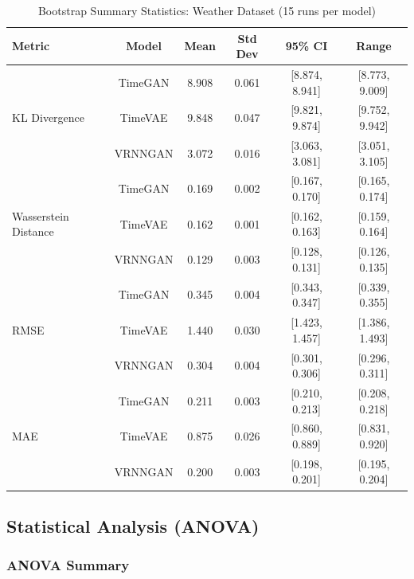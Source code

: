 \documentclass{article}
\begin{document}
\begin{table}[H]
    \centering
    \caption{Bootstrap Summary Statistics: Weather Dataset (15 runs per model)}
    \label{tab:bootstrap_weather}
    \small
    \begin{tabular}{lccccc}
        \toprule
        \textbf{Metric} & \textbf{Model} & \textbf{Mean} & \textbf{Std Dev} & \textbf{95\% CI} & \textbf{Range} \\
        \midrule
        \multirow{3}{*}{KL Divergence} 
    & TimeGAN   & 8.908 & 0.061 & [8.874, 8.941] & [8.773, 9.009] \\
    & TimeVAE   & 9.848 & 0.047 & [9.821, 9.874] & [9.752, 9.942] \\
    & VRNNGAN   & 3.072 & 0.016 & [3.063, 3.081] & [3.051, 3.105] \\
    \midrule
    \multirow{3}{*}{Wasserstein Distance} 
    & TimeGAN   & 0.169 & 0.002 & [0.167, 0.170] & [0.165, 0.174] \\
    & TimeVAE   & 0.162 & 0.001 & [0.162, 0.163] & [0.159, 0.164] \\
    & VRNNGAN   & 0.129 & 0.003 & [0.128, 0.131] & [0.126, 0.135] \\
    \midrule
    \multirow{3}{*}{RMSE} 
    & TimeGAN   & 0.345 & 0.004 & [0.343, 0.347] & [0.339, 0.355] \\
    & TimeVAE   & 1.440 & 0.030 & [1.423, 1.457] & [1.386, 1.493] \\
    & VRNNGAN   & 0.304 & 0.004 & [0.301, 0.306] & [0.296, 0.311] \\
    \midrule
    \multirow{3}{*}{MAE} 
    & TimeGAN   & 0.211 & 0.003 & [0.210, 0.213] & [0.208, 0.218] \\
    & TimeVAE   & 0.875 & 0.026 & [0.860, 0.889] & [0.831, 0.920] \\
    & VRNNGAN   & 0.200 & 0.003 & [0.198, 0.201] & [0.195, 0.204] \\
    \bottomrule
\end{tabular}
\end{table}

\subsection{Statistical Analysis (ANOVA)}



\subsubsection{ANOVA Summary}
\end{document}
